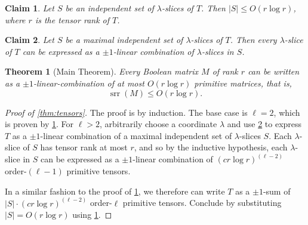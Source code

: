 \documentclass[10pt,a4paper]{amsart}
\newtheorem{theorem}{Theorem}
\newtheorem{claim}{Claim}
\DeclareMathOperator{\ur}{srr}
\begin{document}
\begin{claim} \label{cl:IS-tensors}
	Let $S$ be an independent set of $\lambda$-slices of $T$. Then $|S| \leq O(r \log r)$, where $r$ is the tensor rank of $T$.
\end{claim}

\begin{claim}\label{cl:tensor_linear_combin}
	Let $S$ be a maximal independent set of $\lambda$-slices of $T$.  Then every $\lambda$-slice of $T$ can be expressed as a  $\pm 1$-linear combination of  $\lambda$-slices in $S$.
\end{claim}

\begin{theorem}[Main Theorem]\label{thm:main}
	Every Boolean matrix $M$ of rank $r$ can be written as a $\pm 1$-linear-combination of at most $O(r \log r)$ primitive matrices, that is,
	\[\ur(M) \leq O(r \log r).\]
\end{theorem}

\begin{proof}[Proof of \cref{thm:tensors}]
	The proof is by induction. The base case is $\ell=2$, which is proven by \cref{thm:main}. For $\ell>2$, arbitrarily choose a coordinate  $\lambda$ and use \cref{cl:tensor_linear_combin} to express $T$ as a $\pm 1$-linear combination of a maximal independent set of $\lambda$-slices $S$. Each $\lambda$-slice of $S$ has tensor rank at most $r$, and so by the inductive hypothesis, each $\lambda$-slice in $S$ can be expressed as a $\pm 1$-linear combination of $(cr \log r)^{(\ell - 2)}$ order-$(\ell-1)$ primitive tensors.
	
	In a similar fashion to the proof of \cref{thm:main}, we therefore can write $T$ as a $\pm 1$-sum of ${|S| \cdot (cr \log r)^{(\ell - 2)}}$ order-$\ell$ primitive tensors. Conclude by substituting $|S| = O(r \log r)$ using \cref{cl:IS-tensors}.
\end{proof}
\end{document}

